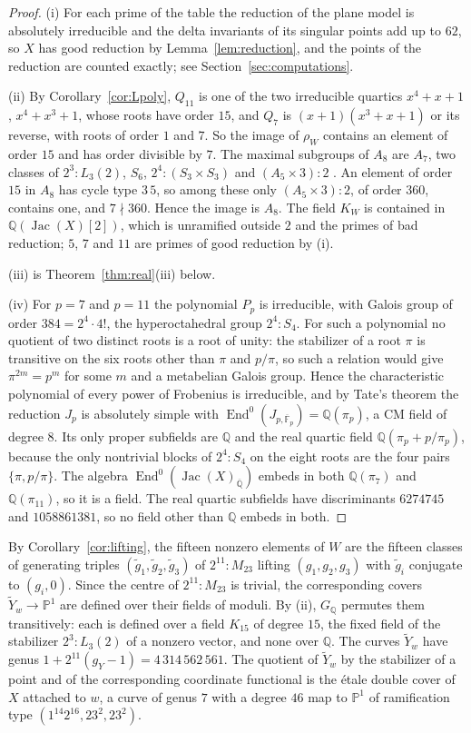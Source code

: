 \documentclass[11pt]{amsart}
\theoremstyle{definition}
\newcommand{\QQ}{\mathbb{Q}}
\newcommand{\FF}{\mathbb{F}}
\newcommand{\PP}{\mathbb{P}}
\newcommand{\Qbar}{\overline{\QQ}}
\newcommand{\End}{\operatorname{End}}
\newcommand{\Jac}{\operatorname{Jac}}
\newcommand{\M}{M_{23}}
\newcommand{\GQ}{G_{\QQ}}
\begin{document}
\begin{proof}
(i) For each prime of the table the reduction of the plane model is absolutely irreducible and the delta invariants of its singular points add up to $62$, so $X$ has good reduction by Lemma~\ref{lem:reduction}, and the points of the reduction are counted exactly; see Section~\ref{sec:computations}.

(ii) By Corollary~\ref{cor:Lpoly}, $Q_{11}$ is one of the two irreducible quartics $x^4+x+1$, $x^4+x^3+1$, whose roots have order $15$, and $Q_7$ is $(x+1)(x^3+x+1)$ or its reverse, with roots of order $1$ and $7$. So the image of $\rho_W$ contains an element of order $15$ and has order divisible by $7$. The maximal subgroups of $A_8$ are $A_7$, two classes of $2^3{:}L_3(2)$, $S_6$, $2^4{:}(S_3\times S_3)$ and $(A_5\times3){:}2$ \cite{ATLAS}. An element of order $15$ in $A_8$ has cycle type $3\,5$, so among these only $(A_5\times3){:}2$, of order $360$, contains one, and $7\nmid360$. Hence the image is $A_8$. The field $K_W$ is contained in $\QQ(\Jac(X)[2])$, which is unramified outside $2$ and the primes of bad reduction; $5$, $7$ and $11$ are primes of good reduction by (i).

(iii) is Theorem~\ref{thm:real}(iii) below.

(iv) For $p=7$ and $p=11$ the polynomial $P_p$ is irreducible, with Galois group of order $384=2^4\cdot4!$, the hyperoctahedral group $2^4{:}S_4$. For such a polynomial no quotient of two distinct roots is a root of unity: the stabilizer of a root $\pi$ is transitive on the six roots other than $\pi$ and $p/\pi$, so such a relation would give $\pi^{2m}=p^m$ for some $m$ and a metabelian Galois group. Hence the characteristic polynomial of every power of Frobenius is irreducible, and by Tate's theorem the reduction $J_p$ is absolutely simple with $\End^0(J_{p,\overline{\FF}_p})=\QQ(\pi_p)$, a CM field of degree $8$. Its only proper subfields are $\QQ$ and the real quartic field $\QQ(\pi_p+p/\pi_p)$, because the only nontrivial blocks of $2^4{:}S_4$ on the eight roots are the four pairs $\{\pi,p/\pi\}$. The algebra $\End^0(\Jac(X)_{\Qbar})$ embeds in both $\QQ(\pi_7)$ and $\QQ(\pi_{11})$, so it is a field. The real quartic subfields have discriminants $6274745$ and $1058861381$, so no field other than $\QQ$ embeds in both.
\end{proof}

By Corollary~\ref{cor:lifting}, the fifteen nonzero elements of $W$ are the fifteen classes of generating triples $(\tilde g_1,\tilde g_2,\tilde g_3)$ of $2^{11}{:}\M$ lifting $(g_1,g_2,g_3)$ with $\tilde g_i$ conjugate to $(g_i,0)$. Since the centre of $2^{11}{:}\M$ is trivial, the corresponding covers $\widetilde Y_w\to\PP^1$ are defined over their fields of moduli. By (ii), $\GQ$ permutes them transitively: each is defined over a field $K_{15}$ of degree $15$, the fixed field of the stabilizer $2^3{:}L_3(2)$ of a nonzero vector, and none over $\QQ$. The curves $\widetilde Y_w$ have genus $1+2^{11}(g_Y-1)=4\,314\,562\,561$. The quotient of $\widetilde Y_w$ by the stabilizer of a point and of the corresponding coordinate functional is the \'etale double cover of $X$ attached to $w$, a curve of genus $7$ with a degree $46$ map to $\PP^1$ of ramification type $(1^{14}2^{16},23^2,23^2)$.
\end{document}
